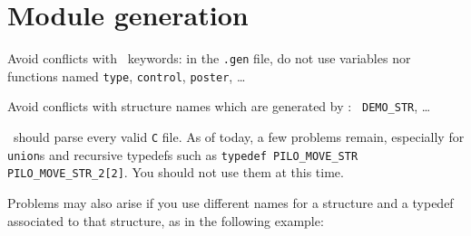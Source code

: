 %
%
%
%
%
%
%

\section{Module generation}

Avoid conflicts with \GenoM\ keywords: in the {\tt .gen} file, do not use
variables nor functions named {\tt type}, {\tt control}, {\tt poster},
\ldots

Avoid conflicts with structure names which are generated by \GenoM: {\tt
DEMO\_STR}, \ldots

\GenoM\ should parse every valid {\tt C} file. As of today, a few
problems remain, especially for {\tt union}s and  recursive typedefs such as
{\tt typedef  PILO\_MOVE\_STR PILO\_MOVE\_STR\_2[2]}.  You should not use
them at this time.

Problems may also arise if you use different names for  a structure and a
typedef associated to that structure, as in the following example:

